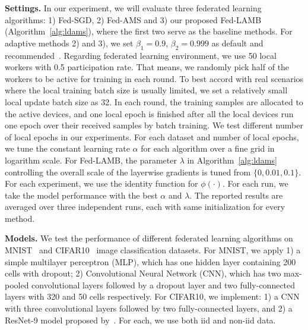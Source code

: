 \documentclass[11pt]{article}
\begin{document}
\vspace{0.05in}
\noindent\textbf{Settings.} In our experiment, we will evaluate three federated learning algorithms: 1) Fed-SGD, 2) Fed-AMS and 3) our proposed Fed-LAMB (Algorithm~\ref{alg:ldams}), where the first two serve as the baseline methods. For adaptive methods 2) and 3), we set $\beta_1=0.9$, $\beta_2=0.999$ as default and recommended~\cite{RKK18}. Regarding federated learning environment, we use 50 local workers with 0.5 participation rate. That means, we randomly pick half of the workers to be active for training in each round. To best accord with real scenarios where the local training batch size is usually limited, we set a relatively small local update batch size as 32. In each round, the training samples are allocated to the active devices, and one local epoch is finished after all the local devices run one epoch over their received samples by batch training. We test different number of local epochs in our experiments. For each dataset and number of local epochs, we tune the constant learning rate $\alpha$ for each algorithm over a fine grid in logarithm scale. For Fed-LAMB, the parameter $\lambda$ in Algorithm~\ref{alg:ldams} controlling the overall scale of the layerwise gradients is tuned from $\{0,0.01,0.1\}$. 
For each experiment, we use the identity function for $\phi(\cdot)$.
For each run, we take the model performance with the best $\alpha$ and $\lambda$. The reported results are averaged over three independent runs, each with same initialization for every method.

\vspace{0.05in}
\noindent\textbf{Models.} We test the performance of different federated learning algorithms on MNIST~\cite{lecun1998mnist} and CIFAR10~\cite{krizhevsky2009learning} image classification datasets. For MNIST, we apply 1) a simple multilayer perceptron (MLP), which has one hidden layer containing 200 cells with dropout; 2) Convolutional Neural Network (CNN), which has two max-pooled convolutional layers followed by a dropout layer and two fully-connected layers with 320 and 50 cells respectively. For CIFAR10, we implement: 1) a CNN with three convolutional layers followed by two fully-connected layers, and 2) a ResNet-9 model proposed by~\cite{Proc:He-resnet16}. 
For each, we use both iid and non-iid data.
\end{document}
